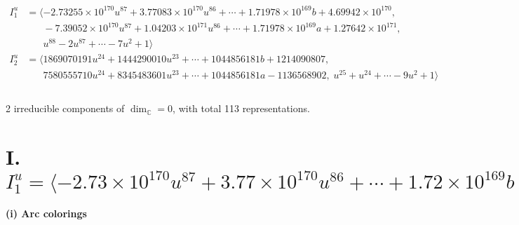 \documentclass[1p]{elsarticle_modified}
\theoremstyle{definition}
\begin{document}
\begin{align*}
I^u_{1}&=\langle 
-2.73255\times10^{170} u^{87}+3.77083\times10^{170} u^{86}+\cdots+1.71978\times10^{169} b+4.69942\times10^{170},\\
\phantom{I^u_{1}}&\phantom{= \langle  }-7.39052\times10^{170} u^{87}+1.04203\times10^{171} u^{86}+\cdots+1.71978\times10^{169} a+1.27642\times10^{171},\\
\phantom{I^u_{1}}&\phantom{= \langle  }u^{88}-2 u^{87}+\cdots-7 u^2+1\rangle \\
I^u_{2}&=\langle 
1869070191 u^{24}+1444290010 u^{23}+\cdots+1044856181 b+1214090807,\\
\phantom{I^u_{2}}&\phantom{= \langle  }7580555710 u^{24}+8345483601 u^{23}+\cdots+1044856181 a-1136568902,\;u^{25}+u^{24}+\cdots-9 u^2+1\rangle \\
\\
\end{align*}
\raggedright * 2 irreducible components of $\dim_{\mathbb{C}}=0$, with total 113 representations.\\
\newpage
\renewcommand{\arraystretch}{1}
\centering \section*{I. $I^u_{1}= \langle -2.73\times10^{170} u^{87}+3.77\times10^{170} u^{86}+\cdots+1.72\times10^{169} b+4.70\times10^{170},\;-7.39\times10^{170} u^{87}+1.04\times10^{171} u^{86}+\cdots+1.72\times10^{169} a+1.28\times10^{171},\;u^{88}-2 u^{87}+\cdots-7 u^2+1 \rangle$}
\flushleft \textbf{(i) Arc colorings}\\
\end{document}

